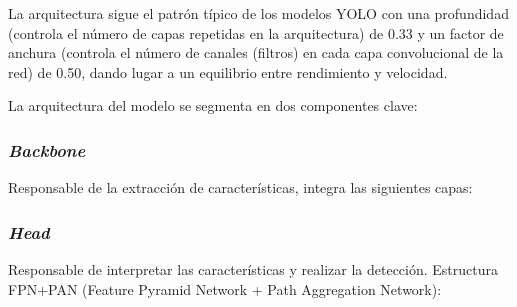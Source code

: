 \documentclass[12pt,a4paper,onecolumn,oneside]{report}
\begin{document}
La arquitectura sigue el patrón típico de los modelos YOLO con una profundidad (controla el número de capas repetidas en la arquitectura) de 0.33 y un factor de anchura 
(controla el número de canales (filtros) en cada capa convolucional de la red) de 0.50, dando lugar a un equilibrio entre rendimiento y velocidad.

La arquitectura del modelo se segmenta en dos componentes clave:

\subsubsection{\textit{Backbone}}

Responsable de la extracción de características, integra las siguientes capas:

\begin{table}[H]
\caption{Estructura del \textit{backbone} del modelo personalizado}
\centering
{}
\end{table}

\subsubsection{\textit{Head}}
Responsable de interpretar las características y realizar la detección. Estructura FPN+PAN (Feature Pyramid Network + Path Aggregation Network):
\end{document}
